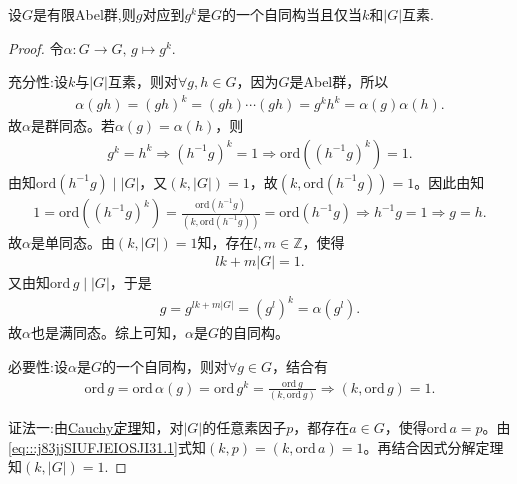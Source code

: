 \documentclass[../../main.tex]{subfiles}%
\begin{document}
\begin{proposition}\label{proposition:g到g的幂的自同构充要条件}
设$G$是有限Abel群,则$g$对应到$g^k$是$G$的一个自同构当且仅当$k$和$|G|$互素.
\end{proposition}
\begin{proof}
令$\alpha: G\to G,\, g\mapsto g^k.$

{\heiti 充分性:}设$k$与$|G|$互素，则对$\forall g,h\in G$，因为$G$是Abel群，所以
\begin{align*}
\alpha(gh)=(gh)^k=(gh)\cdots(gh)=g^kh^k=\alpha(g)\alpha(h).
\end{align*}
故$\alpha$是群同态。若$\alpha(g)=\alpha(h)$，则
\begin{align*}
g^k=h^k\Longrightarrow (h^{-1}g)^k=1\Longrightarrow \mathrm{ord}\left((h^{-1}g)^k\right)=1.
\end{align*}
由知$\mathrm{ord}(h^{-1}g)\mid |G|$，又$(k,|G|)=1$，故$(k,\mathrm{ord}(h^{-1}g))=1$。因此由知
\begin{align*}
1=\mathrm{ord}\left((h^{-1}g)^k\right)=\frac{\mathrm{ord}(h^{-1}g)}{(k,\mathrm{ord}(h^{-1}g))}=\mathrm{ord}(h^{-1}g)\Longrightarrow h^{-1}g=1\Longrightarrow g=h.
\end{align*}
故$\alpha$是单同态。由$(k,|G|)=1$知，存在$l,m\in\mathbb{Z}$，使得
\begin{align*}
lk+m|G|=1.
\end{align*}
又由知$\mathrm{ord}\,g\mid |G|$，于是
\begin{align*}
g=g^{lk+m|G|}=(g^l)^k=\alpha(g^l).
\end{align*}
故$\alpha$也是满同态。综上可知，$\alpha$是$G$的自同构。

{\heiti 必要性:}设$\alpha$是$G$的一个自同构，则对$\forall g\in G$，结合有
\begin{align}
\mathrm{ord}\,g=\mathrm{ord}\,\alpha(g)=\mathrm{ord}\,g^k=\frac{\mathrm{ord}\,g}{(k,\mathrm{ord}\,g)}\Longrightarrow (k,\mathrm{ord}\,g)=1.
\label{eq:::j83jjSIUFJEIOSJI31.1}
\end{align}

{\color{blue}证法一:}由\hyperref[theorem:抽象代数--Cauchy定理]{Cauchy定理}知，对$|G|$的任意素因子$p$，都存在$a\in G$，使得$\mathrm{ord}\,a=p$。由\eqref{eq:::j83jjSIUFJEIOSJI31.1}式知$(k,p)=(k,\mathrm{ord}\,a)=1$。再结合因式分解定理知$(k,|G|)=1$.


\end{proof}
\end{document}
